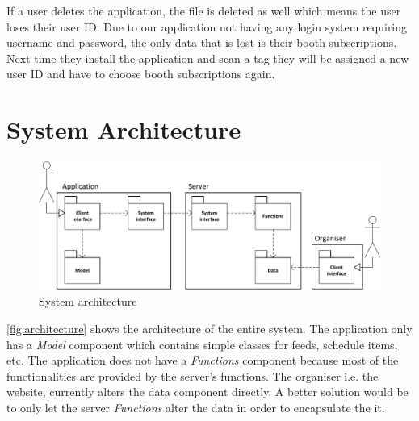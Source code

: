 If a user deletes the application, the file is deleted as well which means the user loses their user ID. Due to our application not having any login system requiring username and password, the only data that is lost is their booth subscriptions. Next time they install the application and scan a tag they will be assigned a new user ID and have to choose booth subscriptions again.

\section{System Architecture}

\begin{figure}[H]
\centering
\includegraphics[width=\linewidth]{img/components.pdf}
\caption{System architecture}
\label{fig:architecture}
\end{figure}

\autoref{fig:architecture} shows the architecture of the entire system. The application only has a \textit{Model} component which contains simple classes for feeds, schedule items, etc. The application does not have a \textit{Functions} component because most of the functionalities are provided by the server's functions. The organiser i.e. the website, currently alters the data component directly. A better solution would be to only let the server \textit{Functions} alter the data in order to encapsulate the it.
